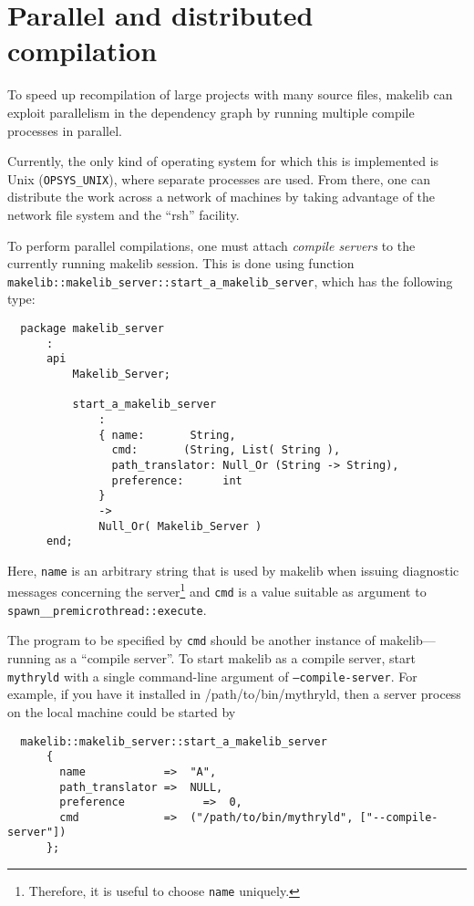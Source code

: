 
\section{Parallel and distributed compilation}
\label{sec:parmake}

To speed up recompilation of large projects with many source files,
makelib can exploit parallelism in the dependency graph by running
multiple compile processes in parallel.

Currently, the only kind of operating system for which this is
implemented is Unix ({\tt OPSYS\_UNIX}), where separate processes are
used.  From there, one can distribute the work across a network of
machines by taking advantage of the network file system and the
``rsh'' facility.

To perform parallel compilations, one must attach {\em compile
servers} to the currently running makelib session.  This is done using
function {\tt makelib::makelib_server::start_a_makelib_server}, which has the
following type:

\begin{verbatim}
  package makelib_server
      :
      api
          Makelib_Server;

          start_a_makelib_server
              :
              { name:       String,
                cmd:       (String, List( String ),
                path_translator: Null_Or (String -> String),
                preference:      int
              }
              ->
              Null_Or( Makelib_Server )
      end;
\end{verbatim}

Here, {\tt name} is an arbitrary string that is used by makelib when
issuing diagnostic messages concerning the server\footnote{Therefore,
it is useful to choose {\tt name} uniquely.} and {\tt cmd} is a value
suitable as argument to {\tt spawn__premicrothread::execute}.

The program to be specified by {\tt cmd} should be another instance of
makelib---running as a ``compile server''.  To start makelib as a compile
server, start {\tt mythryld} with a single command-line argument of
{\tt --compile-server}.
For example, if you have it installed in /path/to/bin/mythryld, then a
server process on the local machine could be started by

\begin{verbatim}
  makelib::makelib_server::start_a_makelib_server
      {
        name            =>  "A",
        path_translator =>  NULL,
        preference            =>  0,
        cmd             =>  ("/path/to/bin/mythryld", ["--compile-server"])
      };
\end{verbatim}

